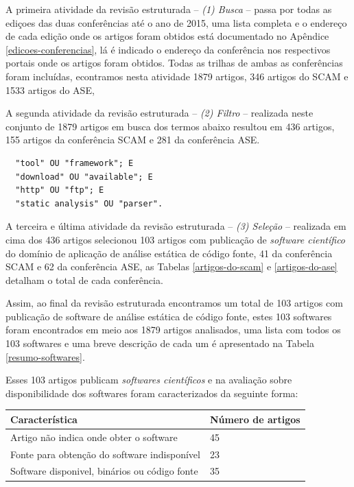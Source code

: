 A primeira atividade da revisão estruturada -- {\it (1) Busca} -- passa por
todas as ediçoes das duas conferências até o ano de 2015, uma lista completa
e o endereço de cada edição onde os artigos foram obtidos está documentado no
Apêndice \ref{edicoes-conferencias}, lá é indicado o endereço da conferência
nos respectivos portais onde os artigos foram obtidos. Todas as trilhas de
ambas as conferências foram incluídas, econtramos nesta atividade 1879 artigos, 346 artigos
do SCAM e 1533 artigos do ASE, 

A segunda atividade da revisão estruturada -- {\it (2) Filtro} -- realizada neste
conjunto de 1879 artigos em busca dos termos abaixo resultou em 436 artigos,
155 artigos da conferência SCAM e 281 da conferência ASE.

\begin{verbatim}
  "tool" OU "framework"; E
  "download" OU "available"; E
  "http" OU "ftp"; E
  "static analysis" OU "parser".
\end{verbatim}

A terceira e última atividade da revisão estruturada -- {\it (3) Seleção} --
realizada em cima dos 436 artigos selecionou 103 artigos com publicação de {\it software
científico} do domínio de aplicação de análise estática de código fonte, 41 da
conferência SCAM e 62 da conferência ASE, as Tabelas \ref{artigos-do-scam} e
\ref{artigos-do-ase} detalham o total de cada conferência.

Assim, ao final da revisão estruturada encontramos um total de 103 artigos com
publicação de software de análise estática de código fonte, estes 103 softwares
foram encontrados em meio aos 1879 artigos analisados,
uma lista com todos os 103 softwares e uma breve descrição de cada um é
apresentado na Tabela \ref{resumo-softwares}.

Esses 103 artigos publicam {\it softwares científicos} e na avaliação sobre
disponibilidade dos softwares foram caracterizados da seguinte forma:

\begin{table}[H]
\centering
\begin{tabular}{| l | l |}
  \hline
  {\bf Característica}                          & {\bf Número de artigos} \\
  \hline
  Artigo não indica onde obter o software       & 45 \\
  \hline
  Fonte para obtenção do software indisponível  & 23 \\
  \hline
  Software disponivel, binários ou código fonte & 35 \\
  \hline
\end{tabular}
\end{table}

